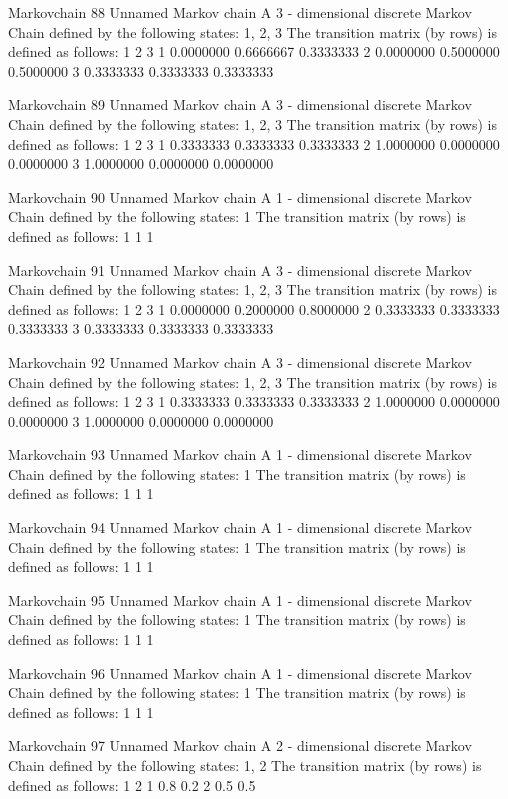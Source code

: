 \documentclass[
  nojss]{jss}
\begin{document}
\begin{CodeChunk}
\begin{CodeOutput}
Markovchain  88 
Unnamed Markov chain 
 A  3 - dimensional discrete Markov Chain defined by the following states: 
 1, 2, 3 
 The transition matrix  (by rows)  is defined as follows: 
          1         2         3
1 0.0000000 0.6666667 0.3333333
2 0.0000000 0.5000000 0.5000000
3 0.3333333 0.3333333 0.3333333

Markovchain  89 
Unnamed Markov chain 
 A  3 - dimensional discrete Markov Chain defined by the following states: 
 1, 2, 3 
 The transition matrix  (by rows)  is defined as follows: 
          1         2         3
1 0.3333333 0.3333333 0.3333333
2 1.0000000 0.0000000 0.0000000
3 1.0000000 0.0000000 0.0000000

Markovchain  90 
Unnamed Markov chain 
 A  1 - dimensional discrete Markov Chain defined by the following states: 
 1 
 The transition matrix  (by rows)  is defined as follows: 
  1
1 1

Markovchain  91 
Unnamed Markov chain 
 A  3 - dimensional discrete Markov Chain defined by the following states: 
 1, 2, 3 
 The transition matrix  (by rows)  is defined as follows: 
          1         2         3
1 0.0000000 0.2000000 0.8000000
2 0.3333333 0.3333333 0.3333333
3 0.3333333 0.3333333 0.3333333

Markovchain  92 
Unnamed Markov chain 
 A  3 - dimensional discrete Markov Chain defined by the following states: 
 1, 2, 3 
 The transition matrix  (by rows)  is defined as follows: 
          1         2         3
1 0.3333333 0.3333333 0.3333333
2 1.0000000 0.0000000 0.0000000
3 1.0000000 0.0000000 0.0000000

Markovchain  93 
Unnamed Markov chain 
 A  1 - dimensional discrete Markov Chain defined by the following states: 
 1 
 The transition matrix  (by rows)  is defined as follows: 
  1
1 1

Markovchain  94 
Unnamed Markov chain 
 A  1 - dimensional discrete Markov Chain defined by the following states: 
 1 
 The transition matrix  (by rows)  is defined as follows: 
  1
1 1

Markovchain  95 
Unnamed Markov chain 
 A  1 - dimensional discrete Markov Chain defined by the following states: 
 1 
 The transition matrix  (by rows)  is defined as follows: 
  1
1 1

Markovchain  96 
Unnamed Markov chain 
 A  1 - dimensional discrete Markov Chain defined by the following states: 
 1 
 The transition matrix  (by rows)  is defined as follows: 
  1
1 1

Markovchain  97 
Unnamed Markov chain 
 A  2 - dimensional discrete Markov Chain defined by the following states: 
 1, 2 
 The transition matrix  (by rows)  is defined as follows: 
    1   2
1 0.8 0.2
2 0.5 0.5


\end{CodeOutput}
\end{CodeChunk}
\end{document}
